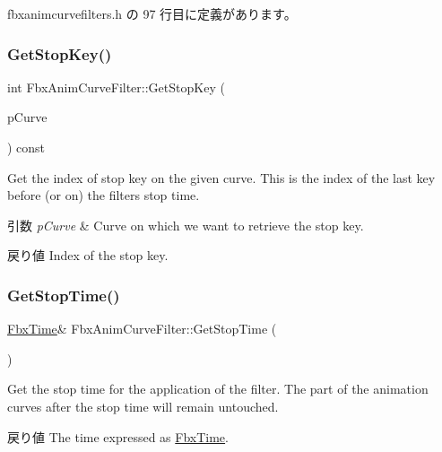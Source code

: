  fbxanimcurvefilters.\+h の 97 行目に定義があります。

\mbox{\label{class_fbx_anim_curve_filter_a94f41fc2b018813560c250c598602cb2}} 
\subsubsection{\texorpdfstring{Get\+Stop\+Key()}{GetStopKey()}}
{\footnotesize\ttfamily int Fbx\+Anim\+Curve\+Filter\+::\+Get\+Stop\+Key (\begin{DoxyParamCaption}\item[{\hyperlink{class_fbx_anim_curve}{Fbx\+Anim\+Curve} \&}]{p\+Curve }\end{DoxyParamCaption}) const}

Get the index of stop key on the given curve. This is the index of the last key before (or on) the filter\textquotesingle{}s stop time. 
\begin{DoxyParams}{引数}
{\em p\+Curve} & Curve on which we want to retrieve the stop key. \\
\hline
\end{DoxyParams}
\begin{DoxyReturn}{戻り値}
Index of the stop key. 
\end{DoxyReturn}
\mbox{\label{class_fbx_anim_curve_filter_afef1281c6f615676466c65ff8c7186a9}} 
\subsubsection{\texorpdfstring{Get\+Stop\+Time()}{GetStopTime()}}
{\footnotesize\ttfamily \hyperlink{class_fbx_time}{Fbx\+Time}\& Fbx\+Anim\+Curve\+Filter\+::\+Get\+Stop\+Time (\begin{DoxyParamCaption}{ }\end{DoxyParamCaption})\hspace{0.3cm}{\ttfamily [inline]}}

Get the stop time for the application of the filter. The part of the animation curves after the stop time will remain untouched. \begin{DoxyReturn}{戻り値}
The time expressed as \hyperlink{class_fbx_time}{Fbx\+Time}. 
\end{DoxyReturn}


